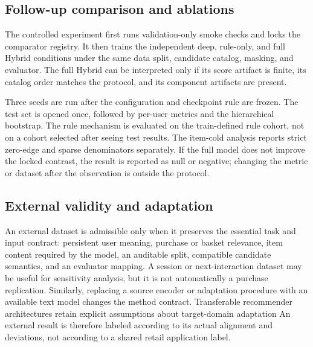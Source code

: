 \documentclass[10pt,a4paper]{article}
\begin{document}
\subsection{Follow-up comparison and ablations}

The controlled experiment first runs validation-only smoke checks and locks the
comparator registry. It then trains the independent deep, rule-only, and full
Hybrid conditions under the same data split, candidate catalog, masking, and
evaluator. The full Hybrid can be interpreted only if its score artifact is
finite, its catalog order matches the protocol, and its component artifacts are
present.

Three seeds are run after the configuration and checkpoint rule are frozen. The
test set is opened once, followed by per-user metrics and the hierarchical
bootstrap. The rule mechanism is evaluated on the train-defined rule cohort,
not on a cohort selected after seeing test results. The item-cold analysis
reports strict zero-edge and sparse denominators separately. If the full model
does not improve the locked contrast, the result is reported as null or
negative; changing the metric or dataset after the observation is outside the
protocol.

\subsection{External validity and adaptation}

An external dataset is admissible only when it preserves the essential task and
input contract: persistent user meaning, purchase or basket relevance, item
content required by the model, an auditable split, compatible candidate
semantics, and an evaluator mapping. A session or next-interaction dataset may
be useful for sensitivity analysis, but it is not automatically a purchase
replication. Similarly, replacing a source encoder or adaptation procedure with
an available text model changes the method contract. Transferable recommender
architectures retain explicit assumptions about target-domain adaptation
\cite{hou2022_unisrec} %
\cite{hou2023_vqrec} %
\cite{zheng2026_utgrec} %
An external result is therefore labeled according to its actual alignment and
deviations, not according to a shared retail application label.
\end{document}
